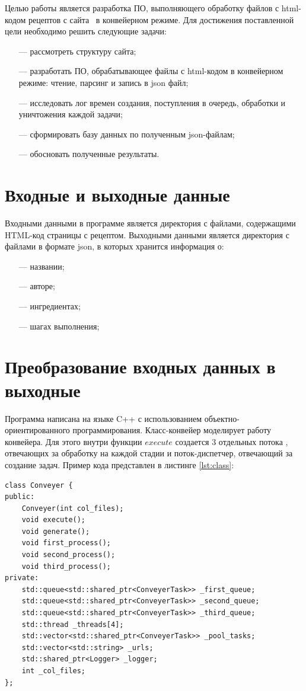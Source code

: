 \documentclass[a4paper, 12pt]{extreport}
\begin{document}
Целью работы является разработка ПО, выполняющего обработку файлов с html-кодом рецептов с сайта~\cite{reciept} в
конвейерном режиме. Для достижения поставленной цели необходимо решить следующие задачи:
\begin{itemize}
	\item[---] рассмотреть структуру сайта;
	\item[---] разработать ПО, обрабатывающее файлы с html-кодом в конвейерном режиме: чтение, парсинг и запись в json
	файл;
	\item[---] исследовать лог времен создания, поступления в очередь, обработки и уничтожения каждой задачи;
	\item[---] сформировать базу данных по полученным json-файлам;
	\item[---] обосновать полученные результаты.
\end{itemize}

\chapter{Входные и выходные данные}

Входными данными в программе является директория с файлами, содержащими HTML-код страницы с рецептом. Выходными
данными является директория с файлами в формате json, в которых хранится информация о:
\begin{itemize}
	\item[---] названии;
	\item[---] авторе;
	\item[---] ингредиентах;
	\item[---] шагах выполнения;
\end{itemize}

\chapter{Преобразование входных данных в выходные}

Программа написана на языке C++ с использованием объектно-ориентированного программирования. Класс-конвейер 
моделирует работу конвейера. Для этого внутри функции $execute$ создается 3 отдельных потока \cite{threads}, отвечающих за 
обработку на каждой стадии и поток-диспетчер, отвечающий за создание задач. Пример кода представлен в листинге 
\ref{lst:class}:

\begin{lstlisting}[style=code, label=lst:class,caption=Класс-конвейер]
class Conveyer {
public:
	Conveyer(int col_files);
	void execute();
	void generate();
	void first_process();
	void second_process();
	void third_process();
private:
	std::queue<std::shared_ptr<ConveyerTask>> _first_queue;
	std::queue<std::shared_ptr<ConveyerTask>> _second_queue;
	std::queue<std::shared_ptr<ConveyerTask>> _third_queue;
	std::thread _threads[4];
	std::vector<std::shared_ptr<ConveyerTask>> _pool_tasks;
	std::vector<std::string> _urls;
	std::shared_ptr<Logger> _logger;
	int _col_files;
};
\end{lstlisting}
\end{document}
